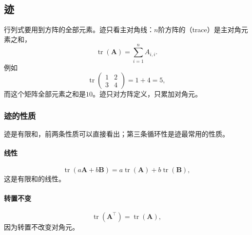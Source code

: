 \subsection{迹}
\label{sec:prelim-matrix-trace}

行列式要用到方阵的全部元素。迹只看主对角线：$n$阶方阵的（trace）是主对角元素之和，
\begin{equation}
 \operatorname{tr}(\bm A)=\sum_{i=1}^n A_{i,i}.
 \label{eq:ls-trace}
\end{equation}
例如
\[
 \operatorname{tr}\begin{pmatrix}1&2\\3&4\end{pmatrix}=1+4=5,
\]
而这个矩阵全部元素之和是$10$。迹只对方阵定义，只累加对角元。

\subsubsection{迹的性质}
\label{sec:ls-matrix-contractions}

迹是有限和，前两条性质可以直接看出；第三条循环性是迹最常用的性质。

\paragraph{线性}
\[
 \operatorname{tr}(a\bm A+b\bm B)=a\operatorname{tr}(\bm A)+b\operatorname{tr}(\bm B),
\]
这是有限和的线性。

\paragraph{转置不变}
\[
 \operatorname{tr}(\bm A^\top)=\operatorname{tr}(\bm A),
\]
因为转置不改变对角元。

